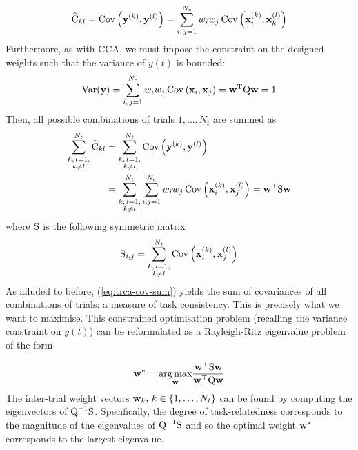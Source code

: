\begin{equation}
    \widehat{{\textrm{C}}}_{k l}=\operatorname{Cov}\left({\mathbf{y}}^{(k)}, {\mathbf{y}}^{(l)}\right)=\sum_{i, \, j=1}^{N_c} w_{i} w_{j} \operatorname{Cov}\left({\mathbf{x}}_{i}^{(k)}, {\mathbf{x}}_{k}^{(l)}\right)
\end{equation}
Furthermore, as with CCA, we must impose the constraint on the designed weights such that the variance of $y(t)$ is bounded:
\begin{equation}
    \operatorname{Var}({\mathbf{y}})=\sum_{i, \, j=1}^{N_c} w_{i} w_{j} \operatorname{Cov}\left({\mathbf{x}}_{i}, {\mathbf{x}}_{j}\right)=\mathbf{w}^{\mathrm{T}} {\textrm{Q}} \mathbf{w}=1
\end{equation}
Then, all possible combinations of trials $1, \dots, N_t$ are summed as
\begin{align}
\begin{split}
\sum_{\substack{k, \, l=1, \\ k\neq l}}^{N_t} \widehat{{\textrm{C}}}_{k l} &=\sum_{\substack{k, \, l=1, \\ k\neq l}}^{N_t} \operatorname{Cov}\left({\mathbf{y}}^{(k)}, {\mathbf{y}}^{(l)}\right) \\
& =\sum_{\substack{k, \, l=1, \\ k\neq l}}^{N_t} \sum_{i, j=1}^{N_c} w_{i} w_{j} \operatorname{Cov}\left({\mathbf{x}}_{i}^{(k)}, {\mathbf{x}}_{j}^{(l)}\right)= {\mathbf{w}}^\top {\textrm{S}} {\mathbf{w}}
\end{split}
\label{eq:trca-cov-sum}
\end{align}
where ${\textrm{S}}$ is the following symmetric matrix
\begin{equation}
    {\textrm{S}}_{i, j} = \sum_{\substack{k, \, l=1, \\ k\neq l}}^{N_t} \operatorname{Cov}\left({\mathbf{x}}_{i}^{(k)}, {\mathbf{x}}_{j}^{(l)}\right)
\end{equation}
As alluded to before, (\ref{eq:trca-cov-sum}) yields the sum of covariances of all combinations of trials: a measure of task consistency. This is precisely what we want to maximise. This constrained optimisation problem (recalling the variance constraint on $y(t)$) can be reformulated as a Rayleigh-Ritz eigenvalue problem of the form 

\begin{equation}
    {\mathbf{w}}^*=\underset{{\mathbf{w}}}{\arg \max } \frac{{\mathbf{w}}^\top {\textrm{S}} {\mathbf{w}}}{{\mathbf{w}}^\top {\textrm{Q}} {\mathbf{w}}}
\label{eq:trca-rayleigh-ritz}
\end{equation}
The inter-trial weight vectors ${\mathbf{w}}_k, \, k \in \{1, \dots, N_t\}$ can be found by computing the eigenvectors of ${\textrm{Q}}^{-1}{\textrm{S}}$. Specifically, the degree of task-relatedness corresponds to the magnitude of the eigenvalues of ${\textrm{Q}}^{-1}{\textrm{S}}$ and so the optimal weight ${\mathbf{w}}^*$ corresponds to the largest eigenvalue.

